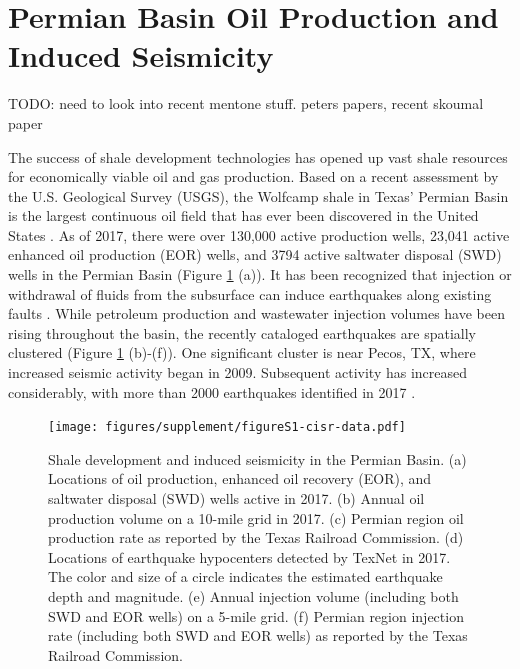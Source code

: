 \documentclass{utexasthesis}
\begin{document}
\section{Permian Basin Oil Production and Induced Seismicity}

TODO: need to look into recent mentone stuff. peters papers, recent skoumal paper

The success of shale development technologies \cite{Waters2006use} has opened up vast shale resources for economically viable oil and gas production. Based on a recent assessment by the U.S. Geological Survey (USGS), the Wolfcamp shale in Texas' Permian Basin is the largest continuous oil field that has ever been discovered in the United States \cite{GaswirthAssessment2016}. As of 2017, there were over 130,000 active production wells, 23,041 active enhanced oil production (EOR) wells, and 3794 active saltwater disposal (SWD) wells in the Permian Basin (Figure \ref{fig:Permian} (a)). It has been recognized that injection or withdrawal of fluids from the subsurface can induce earthquakes along existing faults \cite{Ellsworth2013, simpson1988two}. While petroleum production and wastewater injection volumes have been rising throughout the basin, the recently cataloged earthquakes are spatially clustered (Figure \ref{fig:Permian} (b)-(f)). One significant cluster is near Pecos, TX, where increased seismic activity began in 2009. Subsequent activity has increased considerably, with more than 2000 earthquakes identified in 2017 \cite{Frohlich2019}.


\begin{figure}[hbt!]
\centering
\texttt{[image: figures/supplement/figureS1-cisr-data.pdf]}
\caption{Shale development and induced seismicity in the Permian Basin. 
(a) Locations of oil production, enhanced oil recovery (EOR), and saltwater disposal (SWD) wells active in 2017. (b) Annual oil production volume on a 10-mile grid in 2017. (c) Permian region oil production rate as reported by the Texas Railroad Commission. (d) Locations of earthquake hypocenters detected by TexNet in 2017. The color and size of a circle indicates the estimated earthquake depth and magnitude. (e) Annual injection volume (including both SWD and EOR wells) on a 5-mile grid. (f) Permian region injection rate (including both SWD and EOR wells) as reported by the Texas Railroad Commission.
}
\label{fig:Permian}
\end{figure}
\end{document}
